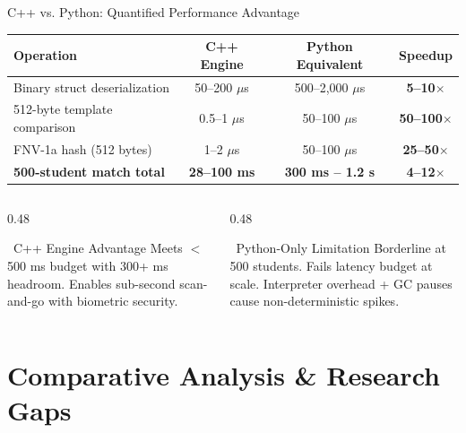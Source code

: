 \documentclass[aspectratio=169, 11pt]{beamer}
\begin{document}
\begin{frame}{C++ vs. Python: Quantified Performance Advantage}
  \begin{center}
    \renewcommand{\arraystretch}{1.25}
    \begin{tabular}{lccc}
      \toprule
      \textbf{Operation} & \textbf{C++ Engine} & \textbf{Python Equivalent} & \textbf{Speedup} \\
      \midrule
      Binary struct deserialization & 50--200 $\mu$s & 500--2,000 $\mu$s & \textbf{5--10$\times$} \\
      512-byte template comparison & 0.5--1 $\mu$s & 50--100 $\mu$s & \textbf{50--100$\times$} \\
      FNV-1a hash (512 bytes) & 1--2 $\mu$s & 50--100 $\mu$s & \textbf{25--50$\times$} \\
      \midrule
      \textbf{500-student match total} & \textbf{28--100 ms} & \textbf{300 ms -- 1.2 s} & \textbf{4--12$\times$} \\
      \bottomrule
    \end{tabular}
  \end{center}
  \vspace{0.2em}
  \begin{columns}[T]
    \begin{column}{0.48\textwidth}
      \begin{exampleblock}{\faCheckCircle\ C++ Engine Advantage}
        \small Meets $<$500 ms budget with 300+ ms headroom. Enables sub-second scan-and-go with biometric security.
      \end{exampleblock}
    \end{column}
    \begin{column}{0.48\textwidth}
      \begin{alertblock}{\faTimesCircle\ Python-Only Limitation}
        \small Borderline at 500 students. Fails latency budget at scale. Interpreter overhead + GC pauses cause non-deterministic spikes.
      \end{alertblock}
    \end{column}
  \end{columns}
\end{frame}

\section{Comparative Analysis \& Research Gaps}
\end{document}
